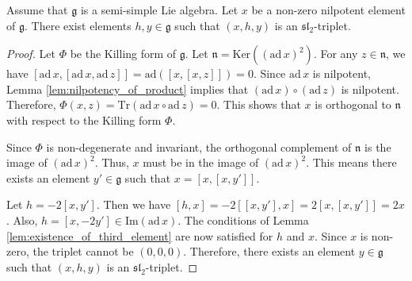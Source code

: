 \begin{theorem}
    \label{thm:jacobson_morozov}
    Assume that $\mathfrak{g}$ is a semi-simple Lie algebra. Let $x$ be a non-zero nilpotent element of $\mathfrak{g}$. There exist elements $h, y \in \mathfrak{g}$ such that $(x, h, y)$ is an $\mathfrak{sl}_2$-triplet.
\end{theorem}

\begin{proof}
    Let $\Phi$ be the Killing form of $\mathfrak{g}$. Let $\mathfrak{n} = \mathrm{Ker}((\mathrm{ad}\,x)^2)$. For any $z \in \mathfrak{n}$, we have $[\mathrm{ad}\,x, [\mathrm{ad}\,x, \mathrm{ad}\,z]] = \mathrm{ad}([x, [x, z]]) = 0$. Since $\mathrm{ad}\,x$ is nilpotent, Lemma \ref{lem:nilpotency_of_product} implies that $(\mathrm{ad}\,x) \circ (\mathrm{ad}\,z)$ is nilpotent. Therefore, $\Phi(x, z) = \mathrm{Tr}(\mathrm{ad}\,x \circ \mathrm{ad}\,z) = 0$. This shows that $x$ is orthogonal to $\mathfrak{n}$ with respect to the Killing form $\Phi$.

    Since $\Phi$ is non-degenerate and invariant, the orthogonal complement of $\mathfrak{n}$ is the image of $(\mathrm{ad}\,x)^2$. Thus, $x$ must be in the image of $(\mathrm{ad}\,x)^2$. This means there exists an element $y' \in \mathfrak{g}$ such that $x = [x, [x, y']]$.

    Let $h = -2[x, y']$. Then we have $[h, x] = -2[[x, y'], x] = 2[x, [x, y']] = 2x$. Also, $h = [x, -2y'] \in \mathrm{Im}(\mathrm{ad}\,x)$. The conditions of Lemma \ref{lem:existence_of_third_element} are now satisfied for $h$ and $x$. Since $x$ is non-zero, the triplet cannot be $(0,0,0)$. Therefore, there exists an element $y \in \mathfrak{g}$ such that $(x, h, y)$ is an $\mathfrak{sl}_2$-triplet.
\end{proof}
